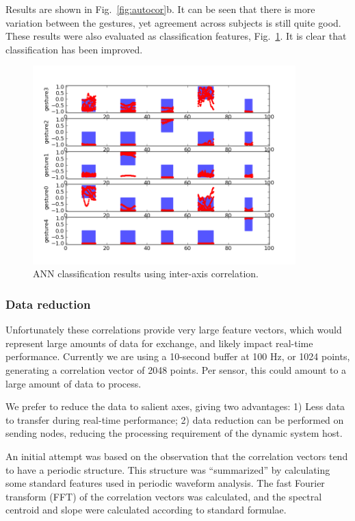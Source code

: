 \documentclass{article}
\begin{document}
Results are shown in Fig.~\ref{fig:autocor}b.
It can be seen that there is more variation between the gestures, yet
agreement across subjects is still quite good.
These results were also evaluated as classification features,
Fig.~\ref{fig:axescor_ann}.
It is clear that classification has been improved.

\begin{figure}
\centerline{
  \includegraphics[width=4in]{axescor_ann.png}}
\caption{ANN classification results using inter-axis correlation.}
\label{fig:axescor_ann}
\end{figure}

\subsubsection{Data reduction}

Unfortunately these correlations provide very large feature vectors,
which would represent large amounts of data for exchange, and likely
impact real-time performance.
Currently we are using a 10-second buffer at 100 Hz, or 1024 points,
generating a correlation vector of 2048 points.
Per sensor, this could amount to a large amount of data to process.

We prefer to reduce the data to salient axes, giving two advantages:
1) Less data to transfer during real-time performance; 2) data
reduction can be performed on sending nodes, reducing the processing
requirement of the dynamic system host.

An initial attempt was based on the observation that the correlation
vectors tend to have a periodic structure.
This structure was ``summarized'' by calculating some standard
features used in periodic waveform analysis.
The fast Fourier transform (FFT) of the correlation vectors was
calculated, and the spectral centroid and slope were calculated
according to standard formulae.
\end{document}
